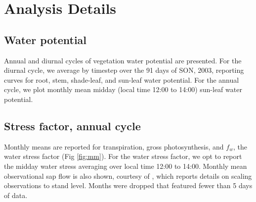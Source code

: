 \documentclass[draft,linenumbers]{agujournal}
\begin{document}
\section{Analysis Details}  
\subsection{Water potential}

Annual and diurnal cycles of vegetation water potential are presented. For the diurnal cycle, we average by timestep over the 91 days of SON, 2003, reporting curves for root, stem, shade-leaf, and sun-leaf water potential. For the annual cycle, we plot monthly mean midday (local time 12:00 to 14:00) sun-leaf water potential.

\subsection{Stress factor, annual cycle}
    Monthly means are reported for transpiration, gross photosynthesis, and $f_w$, the water stress factor (Fig \ref{fig:mm}). For the water stress factor, we opt to report the midday water stress averaging over local time 12:00 to 14:00. Monthly mean observational sap flow is also shown, courtesy of \cite{fisher2007}, which reports details on scaling observations to stand level. Months were dropped that featured fewer than 5 days of data.
\end{document}
